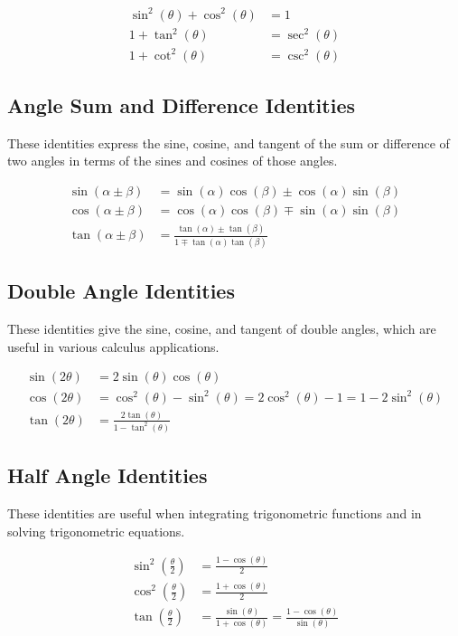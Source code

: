 \documentclass[a4paper,12pt]{book}
\begin{document}
\begin{align*}
\sin^2(\theta) + \cos^2(\theta) &= 1 \\
1 + \tan^2(\theta) &= \sec^2(\theta) \\
1 + \cot^2(\theta) &= \csc^2(\theta)
\end{align*}

\subsection{Angle Sum and Difference Identities}
\label{subsec:angle_sum_difference_identities}
These identities express the sine, cosine, and tangent of the sum or difference of two angles in terms of the sines and cosines of those angles.

\begin{align*}
\sin(\alpha \pm \beta) &= \sin(\alpha)\cos(\beta) \pm \cos(\alpha)\sin(\beta) \\
\cos(\alpha \pm \beta) &= \cos(\alpha)\cos(\beta) \mp \sin(\alpha)\sin(\beta) \\
\tan(\alpha \pm \beta) &= \frac{\tan(\alpha) \pm \tan(\beta)}{1 \mp \tan(\alpha)\tan(\beta)}
\end{align*}

\subsection{Double Angle Identities}
\label{subsec:double_angle_identities}
These identities give the sine, cosine, and tangent of double angles, which are useful in various calculus applications.

\begin{align*}
\sin(2\theta) &= 2\sin(\theta)\cos(\theta) \\
\cos(2\theta) &= \cos^2(\theta) - \sin^2(\theta) = 2\cos^2(\theta) - 1 = 1 - 2\sin^2(\theta) \\
\tan(2\theta) &= \frac{2\tan(\theta)}{1 - \tan^2(\theta)}
\end{align*}

\subsection{Half Angle Identities}
\label{subsec:half_angle_identities}
These identities are useful when integrating trigonometric functions and in solving trigonometric equations.

\begin{align*}
\sin^2\left(\frac{\theta}{2}\right) &= \frac{1 - \cos(\theta)}{2} \\
\cos^2\left(\frac{\theta}{2}\right) &= \frac{1 + \cos(\theta)}{2} \\
\tan\left(\frac{\theta}{2}\right) &= \frac{\sin(\theta)}{1 + \cos(\theta)} = \frac{1 - \cos(\theta)}{\sin(\theta)}
\end{align*}
\end{document}
